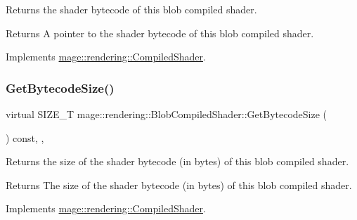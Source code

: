 Returns the shader bytecode of this blob compiled shader.

\begin{DoxyReturn}{Returns}
A pointer to the shader bytecode of this blob compiled shader. 
\end{DoxyReturn}


Implements \hyperlink{classmage_1_1rendering_1_1_compiled_shader_a6067250341f428be19ed2aa9955a10b6}{mage\+::rendering\+::\+Compiled\+Shader}.

\hypertarget{classmage_1_1rendering_1_1_blob_compiled_shader_ac3c3edb09ba96367f8c5d6741ec03041}{}\label{classmage_1_1rendering_1_1_blob_compiled_shader_ac3c3edb09ba96367f8c5d6741ec03041} 
\subsubsection{\texorpdfstring{Get\+Bytecode\+Size()}{GetBytecodeSize()}}
{\footnotesize\ttfamily virtual S\+I\+Z\+E\+\_\+T mage\+::rendering\+::\+Blob\+Compiled\+Shader\+::\+Get\+Bytecode\+Size (\begin{DoxyParamCaption}{ }\end{DoxyParamCaption}) const\hspace{0.3cm}{\ttfamily [override]}, {\ttfamily [virtual]}, {\ttfamily [noexcept]}}

Returns the size of the shader bytecode (in bytes) of this blob compiled shader.

\begin{DoxyReturn}{Returns}
The size of the shader bytecode (in bytes) of this blob compiled shader. 
\end{DoxyReturn}


Implements \hyperlink{classmage_1_1rendering_1_1_compiled_shader_a92c17b46242bf884c3d0d673e88a292d}{mage\+::rendering\+::\+Compiled\+Shader}.

\hypertarget{classmage_1_1rendering_1_1_blob_compiled_shader_a07f7bf56354508ad499133b821e2fdc5}{}\label{classmage_1_1rendering_1_1_blob_compiled_shader_a07f7bf56354508ad499133b821e2fdc5} 
